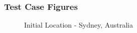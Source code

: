 \documentclass{article}
\begin{document}
\subsubsection{Test Case Figures}
\begin{figure}[H]
    \centering
    \begin{center}
    \end{center}
    \caption{Initial Location - Sydney, Australia}
    \label{fig:my_label}
\end{figure}
\end{document}
